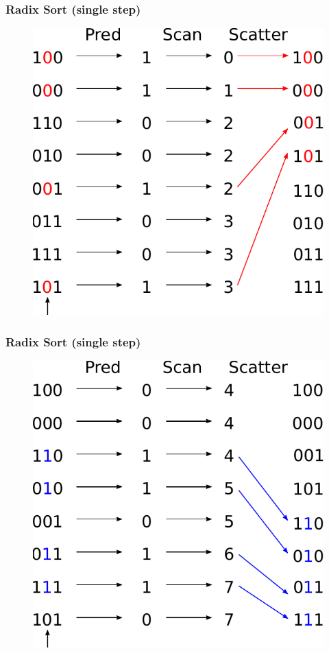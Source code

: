 \documentclass[aspectratio=169]{beamer}
\begin{document}
\frame
{
	\frametitle{Radix Sort (single step)}
	\begin{figure}
		\centering
		\includegraphics[height=0.7\textheight]{radix5}
	\end{figure}
}

\frame
{
	\frametitle{Radix Sort (single step)}
	\begin{figure}
		\centering
		\includegraphics[height=0.7\textheight]{radix6}
	\end{figure}
}
\end{document}
